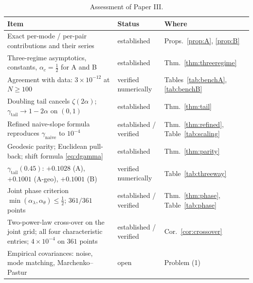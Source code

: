 \documentclass[11pt,reqno]{amsart}
\theoremstyle{plain}
\theoremstyle{definition}
\theoremstyle{remark}
\numberwithin{equation}{section}
\newcommand{\gnaive}{\gamma_{\mathrm{naive}}}
\newcommand{\gtail}{\gamma_{\mathrm{tail}}}
\begin{document}
\begin{table}[ht]
\centering\small
\caption{Assessment of Paper III.}
\label{tab:assessment}
\begin{tabular}{@{}p{}p{}p{}@{}}
\toprule
Item & Status & Where \\
\midrule
Exact per-mode / per-pair contributions and their series & established & Props.~\ref{prop:A}, \ref{prop:B} \\
Three-regime asymptotics, constants, $\alpha_c=\tfrac12$ for A and B & established & Thm.~\ref{thm:threeregime} \\
Agreement with data: $3\times10^{-12}$ at $N\ge100$ & verified numerically & Tables~\ref{tab:benchA}, \ref{tab:benchB} \\
Doubling tail cancels $\zeta(2\alpha)$; $\gtail\to1-2\alpha$ on $(0,1)$ & established & Thm.~\ref{thm:tail} \\
Refined naive-slope formula reproduces $\gnaive$ to $10^{-4}$ & established / verified & Thm.~\ref{thm:refined}, Table~\ref{tab:scaling} \\
Geodesic parity; Euclidean pull-back; shift formula \eqref{eq:dgamma} & established & Thm.~\ref{thm:parity} \\
$\gtail(0.45)$: $+0.1028$ (A), $+0.1001$ (A-geo), $+0.1001$ (B) & verified numerically & Table~\ref{tab:threeway} \\
Joint phase criterion $\min(\alpha_\lambda,\alpha_\theta)\le\tfrac12$; $361/361$ points & established / verified & Thm.~\ref{thm:phase}, Table~\ref{tab:phase} \\
Two-power-law cross-over on the joint grid; all four characteristic entries; $4\times10^{-4}$ on $361$ points & established / verified & Cor.~\ref{cor:crossover} \\
Empirical covariances: noise, mode matching, Marchenko--Pastur & open & Problem (1) \\
\bottomrule
\end{tabular}
\end{table}
\end{document}
